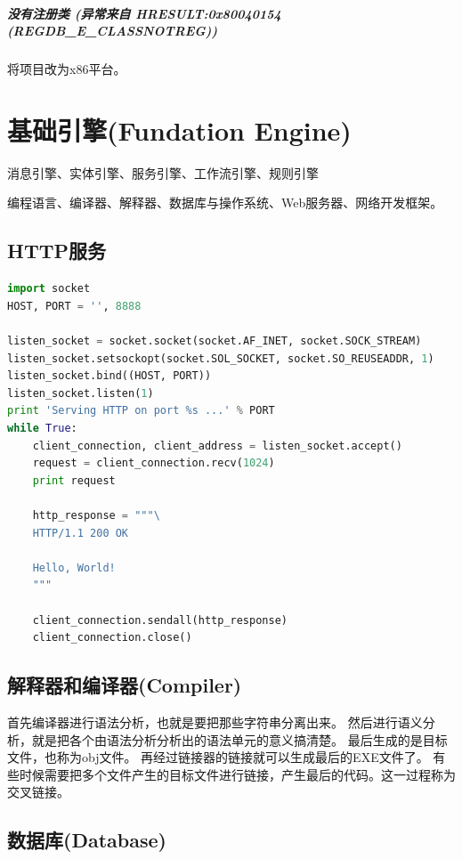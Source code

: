 \documentclass{book}
\begin{document}
\paragraph{没有注册类 (异常来自 HRESULT:0x80040154 (REGDB\_E\_CLASSNOTREG))}将项目改为x86平台。






\chapter{基础引擎(Fundation Engine)}

消息引擎、实体引擎、服务引擎、工作流引擎、规则引擎

编程语言、编译器、解释器、数据库与操作系统、Web服务器、网络开发框架。

\section{HTTP服务}

\begin{lstlisting}[language=Python]
import socket
HOST, PORT = '', 8888

listen_socket = socket.socket(socket.AF_INET, socket.SOCK_STREAM)
listen_socket.setsockopt(socket.SOL_SOCKET, socket.SO_REUSEADDR, 1)
listen_socket.bind((HOST, PORT))
listen_socket.listen(1)
print 'Serving HTTP on port %s ...' % PORT
while True:
    client_connection, client_address = listen_socket.accept()
    request = client_connection.recv(1024)
    print request

    http_response = """\
    HTTP/1.1 200 OK

    Hello, World!
    """

    client_connection.sendall(http_response)
    client_connection.close()
\end{lstlisting}

\section{解释器和编译器(Compiler)}

首先编译器进行语法分析，也就是要把那些字符串分离出来。
然后进行语义分析，就是把各个由语法分析分析出的语法单元的意义搞清楚。
最后生成的是目标文件，也称为obj文件。
再经过链接器的链接就可以生成最后的EXE文件了。
有些时候需要把多个文件产生的目标文件进行链接，产生最后的代码。这一过程称为交叉链接。

\section{数据库(Database)}
\end{document}
